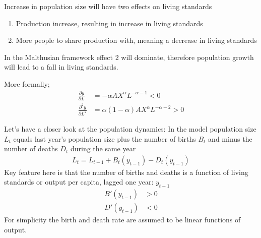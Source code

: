 \documentclass{beamer}
\begin{document}
\begin{frame}
  Increase in population size will have two effects on living standards  
  \begin{enumerate}
    \item Production increase, resulting in increase in living standards
    \item More people to share production with, meaning a decrease in living standards
  \end{enumerate}
  \medskip
  In the Malthusian framework effect 2 will dominate, therefore population growth will lead to a fall in living standards.  
\end{frame}

\begin{frame}
 More formally;
 \begin{align}
  \frac{\partial y}{\partial L} &= -\alpha AX^{\alpha}L^{-\alpha-1} <0\\
  \frac{\partial^2 y}{\partial L^2} &= \alpha(1-\alpha)AX^{\alpha}L^{-\alpha-2}>0
 \end{align}  
\end{frame}

\begin{frame}
 Let's have a closer look at the population dynamics: In the model population size $L_t$ equals last year's population size plus the number of births $B_t$ and minus the number of deaths $D_t$ during the same year
  \begin{align}
   L_t = L_{t-1} + B_t(y_{t-1}) - D_t(y_{t-1})
  \end{align}
  \medskip
  Key feature here is that the number of births and deaths is a function of living standards or output per capita, lagged one year: $y_{t-1}$
  \begin{align}
    B'(y_{t-1})&>0\\
    D'(y_{t-1})&<0  
  \end{align}
  \medskip
  For simplicity the birth and death rate are assumed to be linear functions of output.
\end{frame}
\end{document}
